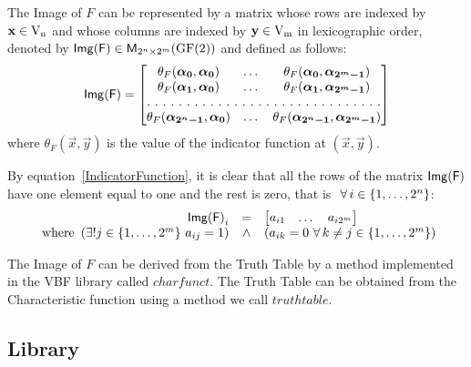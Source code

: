 \begin{definition}
The Image of $F$ can be represented by a matrix whose rows are indexed by $\vec{x} \in \gf{V_n}$ and whose columns are indexed by $\vec{y} \in \gf{V_m}$ in lexicographic order, denoted by $\matr{Img(F)} \in \matr{M}_{2^n \times 2^m}(\gf{GF(2)})$ and defined as follows:
\begin{equation}
\matr{Img(F)} = \begin{bmatrix} \theta_F(\boldsymbol{\alpha_0},\boldsymbol{\alpha_0})&\dots&\theta_F(\boldsymbol{\alpha_0},\boldsymbol{\alpha_{2^m-1}}) \\
\theta_F(\boldsymbol{\alpha_1},\boldsymbol{\alpha_0})&\dots&\theta_F(\boldsymbol{\alpha_1},\boldsymbol{\alpha_{2^m-1}}) \\
\hdotsfor[2]{3}\\
\theta_F(\boldsymbol{\alpha_{2^n-1}},\boldsymbol{\alpha_0})&\dots&\theta_F(\boldsymbol{\alpha_{2^n-1}},\boldsymbol{\alpha_{2^m-1}}) \\
\end{bmatrix} 
\end{equation}
where $\theta_F(\vec{x},\vec{y})$ is the value of the indicator function at $(\vec{x},\vec{y})$.
\end{definition}

\begin{lemma}
By equation~\ref{IndicatorFunction}, it is clear that all the rows of the matrix $\matr{Img(F)}$ have one element equal to one and the rest is zero, that is $\ \fa i \in \{1,\dots,2^n\}$:
\begin{equation}
\begin{array}{rcl}
\matr{Img(F)}_i &=& \begin{bmatrix} a_{i1}&\dots&a_{i2^m} \end{bmatrix} \\
\mbox{ where } \left( \exists!j \in \{1,\dots,2^m\} \ a_{ij}=1 \right) &\wedge& \left( a_{ik} = 0 \ \fa k \neq j \in \{1,\dots,2^m\} \right) 
\end{array}
\end{equation}
\end{lemma}

The Image of $F$ can be derived from the Truth Table by a method implemented in the VBF library called $charfunct$. The Truth Table can be obtained from the Characteristic function using a method we call $truthtable$.

\subsection{Library}

